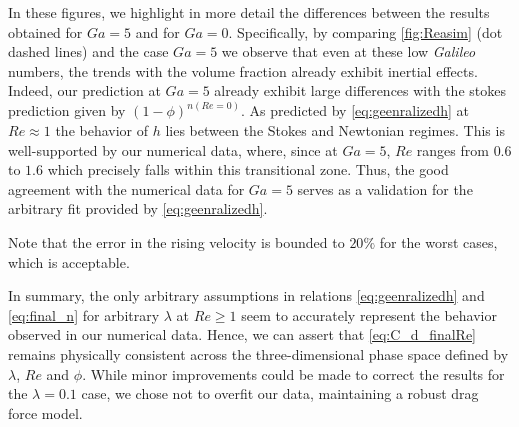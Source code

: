 In these figures, we highlight in more detail the differences between the results obtained for $Ga =5$ and for $Ga = 0$. 
Specifically, by comparing \ref{fig:Reasim} (dot dashed lines) and the case $Ga =5$ we observe that even at these low \textit{Galileo} numbers, the trends with the volume fraction already exhibit inertial effects. 
Indeed, our prediction at $Ga =5$ already exhibit large differences with the stokes prediction given by $(1-\phi)^{n(Re=0)}$. 
As predicted by \ref{eq:geenralizedh} at $Re \approx 1$ the behavior of $h$ lies between the Stokes and Newtonian regimes. 
This is well-supported by our numerical data, where, since at $Ga =5$, $Re$ ranges from $0.6$ to $1.6$ which precisely falls within this transitional zone. 
Thus, the good agreement with the numerical data for $Ga = 5$ serves as a validation for the arbitrary fit provided by \ref{eq:geenralizedh}. 

Note that the error in the rising velocity is bounded to $20\%$ for the worst cases, which is acceptable. 

In summary, the only arbitrary assumptions in relations \ref{eq:geenralizedh} and \ref{eq:final_n} for arbitrary $\lambda$ at $Re \ge 1$ seem to accurately represent the behavior observed in our numerical data. 
Hence, we can assert that \ref{eq:C_d_finalRe} remains physically consistent across the three-dimensional phase space defined by $\lambda$, $Re$ and $\phi$.
While minor improvements could be made to correct the results for the $\lambda = 0.1$ case, we chose not to overfit our data, maintaining a robust drag force model.